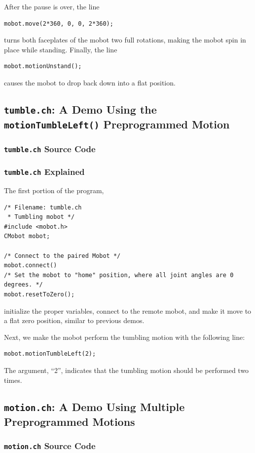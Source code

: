 \documentclass{article}
\begin{document}
After the pause is over, the line
\begin{verbatim}
mobot.move(2*360, 0, 0, 2*360);
\end{verbatim}
turns both faceplates of the mobot two full rotations, making the mobot spin in place
while standing. Finally, the line
\begin{verbatim}
mobot.motionUnstand();
\end{verbatim}
causes the mobot to drop back down into a flat position.

\subsection{\texttt{tumble.ch}: A Demo Using the \texttt{motionTumbleLeft()} Preprogrammed
Motion}
\subsubsection{\texttt{tumble.ch} Source Code}

\subsubsection{\texttt{tumble.ch} Explained}
The first portion of the program,
\begin{verbatim}
/* Filename: tumble.ch 
 * Tumbling mobot */
#include <mobot.h>
CMobot mobot;

/* Connect to the paired Mobot */
mobot.connect()
/* Set the mobot to "home" position, where all joint angles are 0 degrees. */
mobot.resetToZero();
\end{verbatim}
initialize the proper variables, connect to the remote mobot, and make it move
to a flat zero position, similar to previous demos.

Next, we make the mobot perform the tumbling motion with the following line:
\begin{verbatim}
mobot.motionTumbleLeft(2);
\end{verbatim}
The argument, ``2'', indicates that the tumbling motion should be performed
two times.

\subsection{\texttt{motion.ch}: A Demo Using Multiple Preprogrammed Motions}
\subsubsection{\texttt{motion.ch} Source Code}

\end{document}
